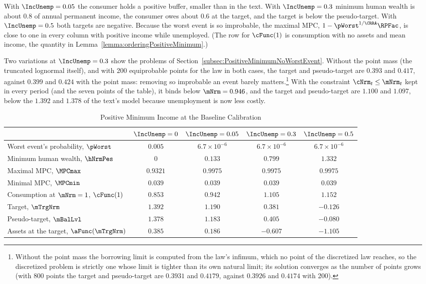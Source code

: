 \documentclass[\econtexRoot/BufferStockTheory]{subfiles}
\begin{document}
With $\IncUnemp=0.05$ the consumer holds a positive buffer, smaller than in the text.
With $\IncUnemp=0.3$ minimum human wealth is about $0.8$ of annual permanent income, the consumer owes about $0.6$ at the target, and the target is below the pseudo-target.
With $\IncUnemp=0.5$ both targets are negative.
Because the worst event is so improbable, the maximal MPC, $1-\pWorst^{1/\CRRA}\RPFac$, is close to one in every column with positive income while unemployed. (The row for $\cFunc(1)$ is consumption with no assets and mean income, the quantity in Lemma~\ref{lemma:orderingPositiveMinimum}.)

Two variations at $\IncUnemp=0.3$ show the problems of Section~\ref{subsec:PositiveMinimumNoWorstEvent}.
Without the point mass (the truncated lognormal itself), and with 200 equiprobable points for the law in both cases, the target and pseudo-target are $0.393$ and $0.417$, against $0.399$ and $0.424$ with the point mass: removing so improbable an event barely matters.\footnote{Without the point mass the borrowing limit is computed from the law's infimum, which no point of the discretized law reaches, so the discretized problem is strictly one whose limit is tighter than its own natural limit; its solution converges as the number of points grows (with 800 points the target and pseudo-target are $0.3931$ and $0.4179$, against $0.3926$ and $0.4174$ with 200).}
With the constraint $\cNrm_{t}\leq\mNrm_{t}$ kept in every period (and the seven points of the table), it binds below $\mNrm=0.946$, and the target and pseudo-target are $1.100$ and $1.097$, below the $1.392$ and $1.378$ of the text's model because unemployment is now less costly.

\begin{table}[ht]
\centering
\caption{Positive Minimum Income at the Baseline Calibration}\label{table:PositiveMinimumExample}
\begin{tabular}{lcccc}
\hline\hline
 & $\IncUnemp=0$ & $\IncUnemp=0.05$ & $\IncUnemp=0.3$ & $\IncUnemp=0.5$ \\
\hline
Worst event's probability, $\pWorst$ & $0.005$ & $6.7\times 10^{-6}$ & $6.7\times 10^{-6}$ & $6.7\times 10^{-6}$ \\
Minimum human wealth, $\hNrmPes$ & $0$ & $0.133$ & $0.799$ & $1.332$ \\
Maximal MPC, $\MPCmax$ & $0.9321$ & $0.9975$ & $0.9975$ & $0.9975$ \\
Minimal MPC, $\MPCmin$ & $0.039$ & $0.039$ & $0.039$ & $0.039$ \\
Consumption at $\mNrm=1$, $\cFunc(1)$ & $0.853$ & $0.942$ & $1.105$ & $1.152$ \\
Target, $\mTrgNrm$ & $1.392$ & $1.190$ & $0.381$ & $-0.126$ \\
Pseudo-target, $\mBalLvl$ & $1.378$ & $1.183$ & $0.405$ & $-0.080$ \\
Assets at the target, $\aFunc(\mTrgNrm)$ & $0.385$ & $0.186$ & $-0.607$ & $-1.105$ \\
\hline\hline
\end{tabular}
\end{table}

\ifSubfilesClassLoaded{\bibfilesfind{\texname}}{}
\end{document}
